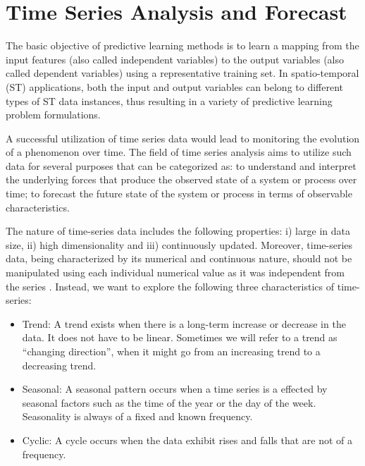 \section{Time Series Analysis and Forecast}
\label{Sec:TimeSeriesForecast}

The basic objective of predictive learning methods is to learn a mapping from the input features (also called independent variables) to the output variables (also called dependent variables) using a representative training set. In spatio-temporal (ST) applications, both the input and output variables can belong to different types of ST data instances, thus resulting in a variety of predictive learning problem formulations.

A successful utilization of time series data would lead to monitoring the evolution of a phenomenon over time. The field of time series analysis aims to utilize such data for several purposes that can be categorized as: to understand and interpret the underlying forces that produce the observed state of a system or process over time; to forecast the future state of the system or process in terms of observable characteristics.

The nature of time-series data includes the following properties: i) large in data size, ii) high dimensionality and iii) continuously updated. Moreover, time-series data, being characterized by its numerical and continuous nature, should not be manipulated using each individual numerical value as it was independent from the series \cite{Pal2017}. Instead, we want to explore the following three characteristics of time-series:

\begin{itemize}
	\item Trend: A trend exists when there is a long-term increase or decrease in the data. It does not have to be linear. Sometimes we will refer to a trend as ``changing direction'', when it might go from an increasing trend to a decreasing trend.
	\item Seasonal: A seasonal pattern occurs when a time series is a effected by seasonal factors such as the time of the year or the day of the week. Seasonality is always of a fixed and known frequency. 
	\item Cyclic: A cycle occurs when the data exhibit rises and falls that are not of a frequency.
\end{itemize}

